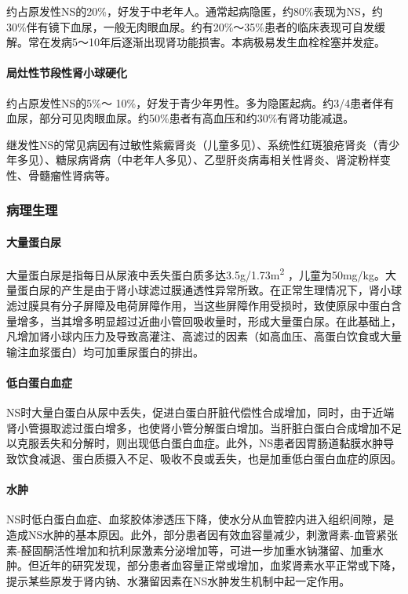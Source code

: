 约占原发性NS的20\%，好发于中老年人。通常起病隐匿，约80\%表现为NS，约30\%伴有镜下血尿，一般无肉眼血尿。约有20\%～35\%患者的临床表现可自发缓解。常在发病5～10年后逐渐出现肾功能损害。本病极易发生血栓栓塞并发症。

\paragraph{局灶性节段性肾小球硬化}

约占原发性NS的5\%～
10\%，好发于青少年男性。多为隐匿起病。约3/4患者伴有血尿，部分可见肉眼血尿。约50\%患者有高血压和约30\%有肾功能减退。

继发性NS的常见病因有过敏性紫癜肾炎（儿童多见）、系统性红斑狼疮肾炎（青少年多见）、糖尿病肾病（中老年人多见）、乙型肝炎病毒相关性肾炎、肾淀粉样变性、骨髓瘤性肾病等。

\subsubsection{病理生理}

\paragraph{大量蛋白尿}

大量蛋白尿是指每日从尿液中丢失蛋白质多达3.5g/1.73m\textsuperscript{2}
，儿童为50mg/kg。大量蛋白尿的产生是由于肾小球滤过膜通透性异常所致。在正常生理情况下，肾小球滤过膜具有分子屏障及电荷屏障作用，当这些屏障作用受损时，致使原尿中蛋白含量增多，当其增多明显超过近曲小管回吸收量时，形成大量蛋白尿。在此基础上，凡增加肾小球内压力及导致高灌注、高滤过的因素（如高血压、高蛋白饮食或大量输注血浆蛋白）均可加重尿蛋白的排出。

\paragraph{低白蛋白血症}

NS时大量白蛋白从尿中丢失，促进白蛋白肝脏代偿性合成增加，同时，由于近端肾小管摄取滤过蛋白增多，也使肾小管分解蛋白增加。当肝脏白蛋白合成增加不足以克服丢失和分解时，则出现低白蛋白血症。此外，NS患者因胃肠道黏膜水肿导致饮食减退、蛋白质摄入不足、吸收不良或丢失，也是加重低白蛋白血症的原因。

\paragraph{水肿}

NS时低白蛋白血症、血浆胶体渗透压下降，使水分从血管腔内进入组织间隙，是造成NS水肿的基本原因。此外，部分患者因有效血容量减少，刺激肾素-血管紧张素-醛固酮活性增加和抗利尿激素分泌增加等，可进一步加重水钠潴留、加重水肿。但近年的研究发现，部分患者血容量正常或增加，血浆肾素水平正常或下降，提示某些原发于肾内钠、水潴留因素在NS水肿发生机制中起一定作用。

